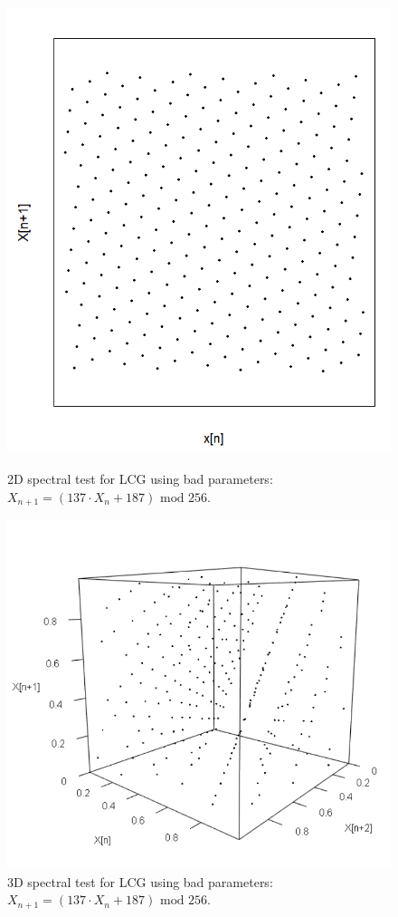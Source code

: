 \begin{figure}
	\centering
	\begin{minipage}{0.45\textwidth}
		\centering
		\includegraphics[width=\linewidth]{billder/spec_bad_lcg_2d.png}
		\caption{2D spectral test for LCG using bad parameters: $X_{n+1}=(137\cdot X_{n}+187) \text{ mod } 256$.}
		\label{fig:badspec2d}
	\end{minipage}\hfill
	\begin{minipage}{0.45\textwidth}
		\centering
		\includegraphics[width=\linewidth]{billder/spec_bad_lcg_3d.png}
		\caption{3D spectral test for LCG using bad parameters: $X_{n+1}=(137\cdot X_{n}+187) \text{ mod } 256$.}
		\label{fig:badspec3d}
	\end{minipage}
\end{figure}

